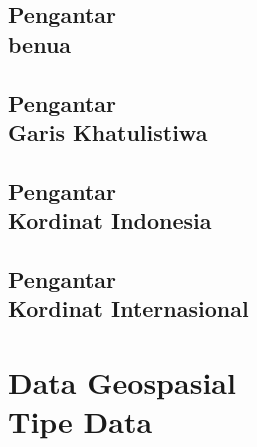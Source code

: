 \documentclass{WileySix}
\begin{document}
\chapter[Benua]
{Pengantar\\ benua}



%



\chapter[Garis Khatulistiwa]
{Pengantar\\ Garis Khatulistiwa}



\chapter[Kordinat Indonesia]
{Pengantar\\ Kordinat Indonesia}


\chapter[Kordinat Internasional]
{Pengantar\\ Kordinat Internasional}



\part[Data Geospasial]
{Data Geospasial\\ Tipe Data}

%

%





\printindex
\end{document}
